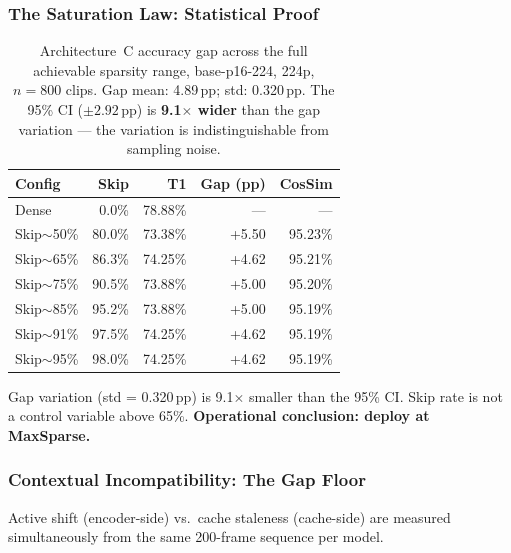 \documentclass{article}
\begin{document}
\subsubsection{The Saturation Law: Statistical Proof}
\label{sec:saturation-law}

\begin{table}[htbp]
\centering
\setlength{\tabcolsep}{4.5pt}
\renewcommand{\arraystretch}{1.12}
\begin{tabular}{lrrrr}
\toprule
\textbf{Config} & \textbf{Skip} & \textbf{T1} & \textbf{Gap (pp)} & \textbf{CosSim} \\
\midrule
Dense              &  0.0\% & 78.88\% & ---   & ---    \\
Skip$\sim$50\%     & 80.0\% & 73.38\% & +5.50 & 95.23\% \\
Skip$\sim$65\%     & 86.3\% & 74.25\% & +4.62 & 95.21\% \\
Skip$\sim$75\%     & 90.5\% & 73.88\% & +5.00 & 95.20\% \\
Skip$\sim$85\%     & 95.2\% & 73.88\% & +5.00 & 95.19\% \\
Skip$\sim$91\%     & 97.5\% & 74.25\% & +4.62 & 95.19\% \\
Skip$\sim$95\%     & 98.0\% & 74.25\% & +4.62 & 95.19\% \\
\bottomrule
\end{tabular}
\caption{Architecture~C accuracy gap across the full achievable sparsity
range, base-p16-224, 224p, $n = 800$ clips. Gap mean: 4.89\,pp; std:
0.320\,pp. The 95\% CI ($\pm 2.92$\,pp) is \textbf{9.1$\times$ wider} than
the gap variation — the variation is indistinguishable from sampling noise.}
\label{tab:saturation-proof}
\end{table}

Gap variation (std = 0.320\,pp) is 9.1$\times$ smaller than the 95\%
CI. Skip rate is not a control variable above 65\%.
\textbf{Operational conclusion: deploy at MaxSparse.}

\subsubsection{Contextual Incompatibility: The Gap Floor}
\label{sec:contextual-incompatibility}

Active shift (encoder-side) vs.\ cache staleness (cache-side) are
measured simultaneously from the same 200-frame sequence per model.
\end{document}
